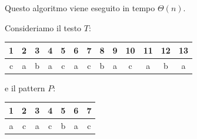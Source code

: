 Questo algoritmo viene eseguito in tempo $\Theta(n)$.
\newpage
\begin{esempio}
    Consideriamo il testo $T$:
    \begin{table}[!ht]
        \centering
        \begin{tabular}{ccccccccccccc}
            1                       & 2                      & 3
                                    & 4                      & 5
                                    & 6                      & 7
                                    & 8                      & 9
                                    & 10                     & 11
                                    & 12                     & 13 \\ \hline
            \multicolumn{1}{|c|}{c} & \multicolumn{1}{c|}{a} &
            \multicolumn{1}{c|}{b}  & \multicolumn{1}{c|}{a} &
            \multicolumn{1}{c|}{c}  & \multicolumn{1}{c|}{a} &
            \multicolumn{1}{c|}{c}  & \multicolumn{1}{c|}{b} &
            \multicolumn{1}{c|}{a}  & \multicolumn{1}{c|}{c} &
            \multicolumn{1}{c|}{a}  & \multicolumn{1}{c|}{b} &
            \multicolumn{1}{c|}{a}                                \\ \hline
        \end{tabular}
    \end{table}

    e il pattern $P$:
    \begin{table}[!ht]
        \centering
        \begin{tabular}{ccccccc}
            1                       & 2                      & 3
                                    & 4                      & 5
                                    & 6                      & 7 \\ \hline
            \multicolumn{1}{|c|}{a} & \multicolumn{1}{c|}{c} &
            \multicolumn{1}{c|}{a}  & \multicolumn{1}{c|}{c} &
            \multicolumn{1}{c|}{b}  & \multicolumn{1}{c|}{a} &
            \multicolumn{1}{c|}{c}                               \\ \hline
        \end{tabular}
    \end{table}


\end{esempio}
